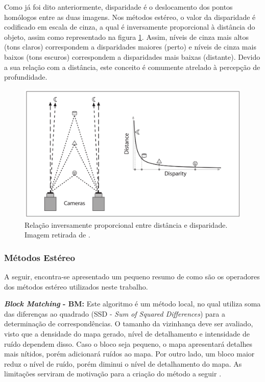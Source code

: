 Como já foi dito anteriormente, disparidade é o deslocamento dos pontos homólogos entre as duas imagens. Nos métodos estéreo, o valor da disparidade é codificado em escala de cinza, a qual é inversamente proporcional à distância do objeto, assim como representado na figura \ref{depth_disparity}. Assim, níveis de cinza mais altos (tons claros) correspondem a disparidades maiores (perto) e níveis de cinza mais baixos (tons escuros) correspondem a disparidades mais baixas (distante). Devido a sua relação com a distância, este conceito é comumente atrelado à percepção de profundidade.

\begin{figure}[H]
 	\centering
 	\includegraphics[scale=0.3]{./Resources/bradski/depth_disparity.png}
 	\caption{Relação inversamente proporcional entre distância e disparidade. Imagem retirada de \cite{Bradski2008}.}
 	\label{depth_disparity}
\end{figure}

\subsubsection{Métodos Estéreo}
\label{stereo_methods}
A seguir, encontra-se apresentado um pequeno resumo de como são os operadores dos métodos estéreo utilizados neste trabalho.

\textbf{\textit{Block Matching} - BM:} Este algoritmo é um método local, no qual utiliza soma das diferenças ao quadrado (SSD - \textit{Sum of Squared Differences}) para a determinação de correspondências. O tamanho da vizinhança deve ser avaliado, visto que a densidade do mapa gerado, nível de detalhamento e intensidade de ruído dependem disso. Caso o bloco seja pequeno, o mapa apresentará detalhes mais nítidos, porém adicionará ruídos ao mapa. Por outro lado, um bloco maior reduz o nível de ruído, porém diminui o nível de detalhamento do mapa. As limitações serviram de motivação para a criação do método a seguir \cite{Hirschmuller2008}.   

